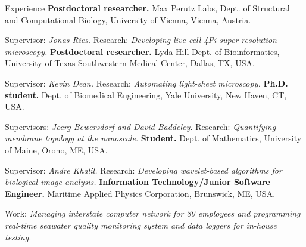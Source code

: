 \begin{rubric}{Experience}
%
	\textbf{Postdoctoral researcher.} Max Perutz Labs, Dept. of Structural and Computational Biology, University of Vienna, Vienna, Austria. \par
    Supervisor: \emph{Jonas Ries.} Research: \emph{Developing live-cell 4Pi super-resolution microscopy.}
%
\entry*[2022 -- 2023]%
	\textbf{Postdoctoral researcher.} Lyda Hill Dept. of Bioinformatics, University of Texas Southwestern Medical Center, Dallas, TX, USA. \par
    Supervisor: \emph{Kevin Dean.} Research: \emph{Automating light-sheet microscopy.}
%
\entry*[2017 -- 2022]%
	\textbf{Ph.D. student.} Dept. of Biomedical Engineering, Yale University, New Haven, CT, USA. \par
    Supervisors: \emph{Joerg Bewersdorf and David Baddeley.} Research: \emph{Quantifying membrane topology at the nanoscale.}
%
\entry*[2012 -- 2017]%
	\textbf{Student.} Dept. of Mathematics, University of Maine, Orono, ME, USA. \par
    Supervisor: \emph{Andre Khalil.} Research: \emph{Developing wavelet-based algorithms for biological image analysis.}
%
\entry*[2011 -- 2012]%
	\textbf{Information Technology/Junior Software Engineer.} Maritime Applied Physics Corporation, Brunswick, ME, USA. \par
    Work: \emph{Managing interstate computer network for 80 employees and programming real-time seawater quality monitoring system and data loggers for in-house testing.}
%
\end{rubric}